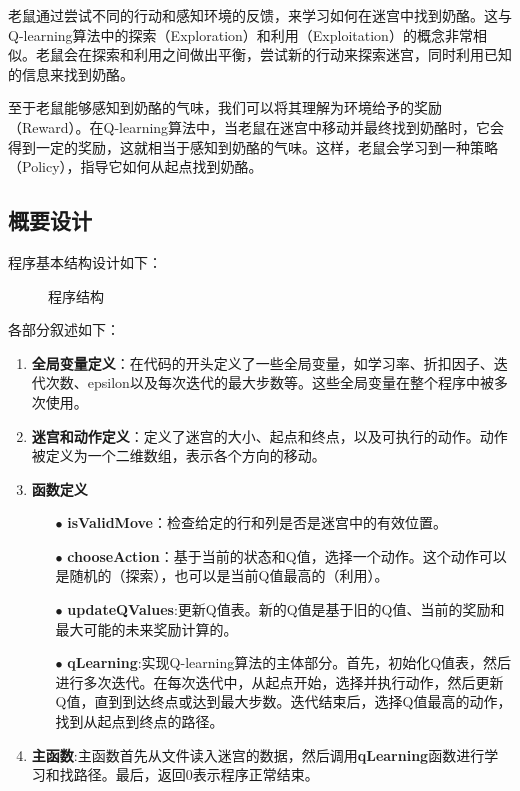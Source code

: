 \documentclass[UTF8,titlepage]{ctexart}
\numberwithin{figure}{section}
\begin{document}
老鼠通过尝试不同的行动和感知环境的反馈，来学习如何在迷宫中找到奶酪。这与Q-learning算法中的探索（Exploration）和利用（Exploitation）的概念非常相似。老鼠会在探索和利用之间做出平衡，尝试新的行动来探索迷宫，同时利用已知的信息来找到奶酪。

至于老鼠能够感知到奶酪的气味，我们可以将其理解为环境给予的奖励（Reward）。在Q-learning算法中，当老鼠在迷宫中移动并最终找到奶酪时，它会得到一定的奖励，这就相当于感知到奶酪的气味。这样，老鼠会学习到一种策略（Policy），指导它如何从起点找到奶酪。

\subsection{概要设计}
程序基本结构设计如下：
\begin{figure}[H]
\centering
 \caption{程序结构}
 \label{}
\end{figure}

各部分叙述如下：
\begin{enumerate}
    \item \textbf{全局变量定义}：在代码的开头定义了一些全局变量，如学习率、折扣因子、迭代次数、epsilon以及每次迭代的最大步数等。这些全局变量在整个程序中被多次使用。
    \item \textbf{迷宫和动作定义}：定义了迷宫的大小、起点和终点，以及可执行的动作。动作被定义为一个二维数组，表示各个方向的移动。
    \item \textbf{函数定义}{
        \begin{enumerate}
            \item[$\bullet$] \textbf{isValidMove}：检查给定的行和列是否是迷宫中的有效位置。
            \item[$\bullet$] \textbf{chooseAction}：基于当前的状态和Q值，选择一个动作。这个动作可以是随机的（探索），也可以是当前Q值最高的（利用）。
            \item[$\bullet$] \textbf{updateQValues}:更新Q值表。新的Q值是基于旧的Q值、当前的奖励和最大可能的未来奖励计算的。
            \item[$\bullet$] \textbf{qLearning}:实现Q-learning算法的主体部分。首先，初始化Q值表，然后进行多次迭代。在每次迭代中，从起点开始，选择并执行动作，然后更新Q值，直到到达终点或达到最大步数。迭代结束后，选择Q值最高的动作，找到从起点到终点的路径。
        \end{enumerate}
    }
    \item \textbf{主函数}:主函数首先从文件读入迷宫的数据，然后调用\textbf{qLearning}函数进行学习和找路径。最后，返回0表示程序正常结束。 
\end{enumerate}
\end{document}
